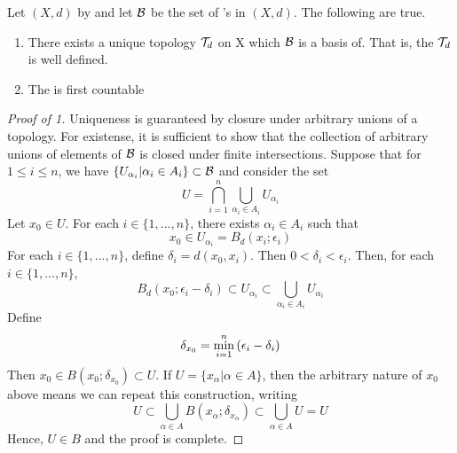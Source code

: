 \label{prop:pseudometrictopology}
\begin{prop}
    Let $(X,d)$ by  \PseudometricSpace and let $\mathcal{B}$ be the set of \OpenBall's in $(X,d)$. 
    The following are true. 
    \begin{enumerate}
        \item There exists a unique topology $\mathcal{T}_d$ on X which $\mathcal{B}$ is a basis of. That is, the \PseudometricTopology $\mathcal{T}_d$ is well defined. 
        \item The \PseudometricInducedTopology is first countable
    \end{enumerate}
    \begin{proof}[Proof of 1]
        Uniqueness is guaranteed by closure under arbitrary unions of a topology. 
        For existense, it is sufficient to show that the collection of arbitrary unions
        of elements of $\mathcal{B}$ is closed under finite intersections. 
        Suppose that for $1\leq i \leq n$, we have $\{U_{\alpha_i} | \alpha_i \in A_i\} \subset \mathcal{B}$
        and consider the set
        \begin{equation}
            U=\bigcap_{i=1}^n \bigcup_{\alpha_i \in A_i} U_{\alpha_i}
        \end{equation}
        Let $x_0 \in U$. 
        For each $i \in \{1, ..., n\}$, there exists $\alpha_i \in A_i$ such that 
        \begin{equation}
            x_0 \in U_{\alpha_i} = B_d(x_i; \epsilon_i)
        \end{equation}
        For each $i \in \{1, ..., n \}$, define $\delta_i = d(x_0, x_i)$. Then $0 < \delta_i < \epsilon_i$. 
        Then, for each $i \in \{1, ..., n \}$, 
        \begin{equation}
            B_d(x_0; \epsilon_i-\delta_i) \subset U_{\alpha_i} \subset \bigcup_{\alpha_i \in A_i} U_{\alpha_i}
        \end{equation}
        Define 
        \begin{equation}
            \delta_{x_0} = \min\limits_{i=1}^n \left(  \epsilon_i-\delta_i\right)
        \end{equation}
        Then $x_0 \in B(x_0; \delta_{x_0} ) \subset U$. 
        If $U=\{x_{\alpha} | \alpha \in A\}$, then the arbitrary nature of $x_0$ above means 
        we can repeat this construction, writing 
        \begin{equation}
            U \subset \bigcup_{\alpha \in A} B(x_{\alpha} ; \delta_{x_{\alpha}} )\subset \bigcup_{\alpha \in A} U = U
        \end{equation}
        Hence, $U \in B$ and the proof is complete. 
    \end{proof}
\end{prop}